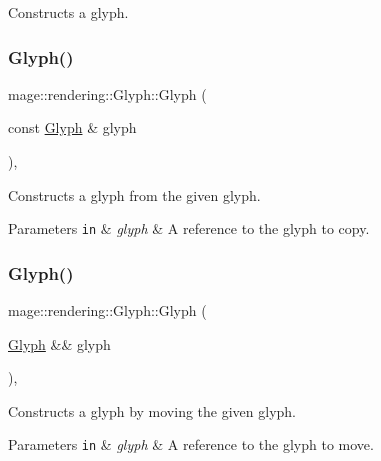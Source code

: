 Constructs a glyph. \mbox{\label{structmage_1_1rendering_1_1_glyph_a97d90fe10ed59c2d594d0c194e072e7a}} 
\subsubsection{\texorpdfstring{Glyph()}{Glyph()}\hspace{0.1cm}{\footnotesize\ttfamily [2/3]}}
{\footnotesize\ttfamily mage\+::rendering\+::\+Glyph\+::\+Glyph (\begin{DoxyParamCaption}\item[{const \mbox{\hyperlink{structmage_1_1rendering_1_1_glyph}{Glyph}} \&}]{glyph }\end{DoxyParamCaption})\hspace{0.3cm}{\ttfamily [default]}, {\ttfamily [noexcept]}}

Constructs a glyph from the given glyph.


\begin{DoxyParams}[1]{Parameters}
\mbox{\tt in}  & {\em glyph} & A reference to the glyph to copy. \\
\hline
\end{DoxyParams}
\mbox{\label{structmage_1_1rendering_1_1_glyph_afc4ecea45f0a261964420195ef1f99ac}} 
\subsubsection{\texorpdfstring{Glyph()}{Glyph()}\hspace{0.1cm}{\footnotesize\ttfamily [3/3]}}
{\footnotesize\ttfamily mage\+::rendering\+::\+Glyph\+::\+Glyph (\begin{DoxyParamCaption}\item[{\mbox{\hyperlink{structmage_1_1rendering_1_1_glyph}{Glyph}} \&\&}]{glyph }\end{DoxyParamCaption})\hspace{0.3cm}{\ttfamily [default]}, {\ttfamily [noexcept]}}

Constructs a glyph by moving the given glyph.


\begin{DoxyParams}[1]{Parameters}
\mbox{\tt in}  & {\em glyph} & A reference to the glyph to move. \\
\hline
\end{DoxyParams}
\mbox{\label{structmage_1_1rendering_1_1_glyph_a710f60d35f3af4ce978e2df974e4ea4c}} 
